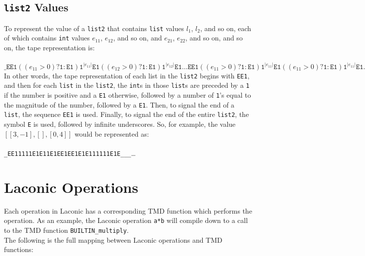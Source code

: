 \documentclass[11pt]{article}
\begin{document}
\subsection{\texttt{list2} Values}

To represent the value of a \texttt{list2} that contains \texttt{list} values $l_1$, $l_2$, and so on, each of which contains \texttt{int} values $e_{11}$, $e_{12}$, and so on, and $e_{21}$, $e_{22}$, and so on, and so on, the tape representation is: \\ \\
$\texttt{_EE1}((e_{11}>0)?\texttt{1}:\texttt{E1})\texttt{1}^{|e_{11}|}\texttt{E1}
((e_{12}>0)?\texttt{1}:\texttt{E1})\texttt{1}^{|e_{12}|}\texttt{E1}\dots\texttt{EE1}
((e_{11}>0)?\texttt{1}:\texttt{E1})\texttt{1}^{|e_{11}|}\texttt{E1}
((e_{11}>0)?\texttt{1}:\texttt{E1})\texttt{1}^{|e_{11}|}\texttt{E1}\dots\dots\texttt{E_}^\infty$ \\

In other words, the tape representation of each list in the \texttt{list2} begins with \texttt{EE1}, and then for each \texttt{list} in the \texttt{list2}, the \texttt{int}s in those \texttt{list}s are preceded by a \texttt{1} if the number is positive and a \texttt{E1} otherwise, followed by a number of \texttt{1}'s equal to the magnitude of the number, followed by a \texttt{E1}. Then, to signal the end of a \texttt{list}, the sequence \texttt{EE1} is used. Finally, to signal the end of the entire \texttt{list2}, the symbol \texttt{E} is used, followed by infinite underscores. So, for example, the value $[[3,-1], [], [0,4]]$ would be represented as: \\ \\
\texttt{_EE11111E1E11E1EE1EE1E1E111111E1E___}\dots

\section{Laconic Operations}

Each operation in Laconic has a corresponding TMD function which performs the operation. As an example, the Laconic operation \texttt{a*b} will compile down to a call to the TMD function \texttt{BUILTIN_multiply}. \\

The following is the full mapping between Laconic operations and TMD functions: \\ \\
\end{document}
